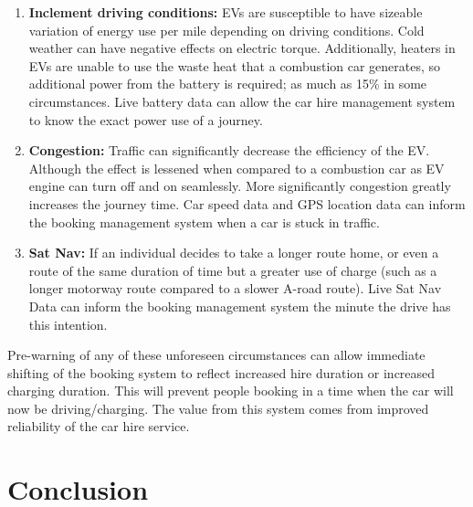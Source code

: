 \documentclass[conference]{IEEEtran}
\begin{document}
\begin{enumerate}
\item {\textbf{Inclement driving conditions:}} EVs are susceptible to
  have sizeable variation of energy use per mile depending on driving
  conditions. Cold weather can have negative effects on electric
  torque. Additionally, heaters in EVs are unable to use the waste
  heat that a combustion car generates, so additional power from the
  battery is required; as much as 15\% in some circumstances. Live
  battery data can allow the car hire management system to know the
  exact power use of a journey.
\item {\textbf{Congestion:}} Traffic can significantly decrease the
  efficiency of the EV. Although the effect is lessened when compared
  to a combustion car as EV engine can turn off and on
  seamlessly. More significantly congestion greatly increases the
  journey time. Car speed data and GPS location data can inform the
  booking management system when a car is stuck in traffic.
\item {\textbf{Sat Nav:}} If an individual decides to take a longer
  route home, or even a route of the same duration of time but a
  greater use of charge (such as a longer motorway route compared to a
  slower A-road route). Live Sat Nav Data can inform the booking
  management system the minute the drive has this intention. 
\end{enumerate}

Pre-warning of any of these unforeseen circumstances can allow
immediate shifting of the booking system to reflect increased hire
duration or increased charging duration. This will prevent people
booking in a time when the car will now be driving/charging. The value
from this system comes from improved reliability of the car hire
service.


\section{Conclusion} 







\end{document}
